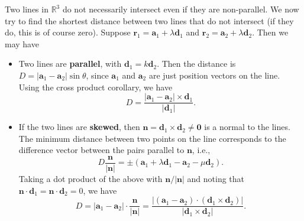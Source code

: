 \documentclass[letter-paper]{tufte-book}
\newcommand{\ab}{\boldsymbol{a}}
\newcommand{\db}{\boldsymbol{d}}
\newcommand{\nb}{\boldsymbol{n}}
\newcommand\Def[1]{\textbf{#1}}
\begin{document}
Two lines in $\mathbb{R}^3$ do not necessarily intersect even if they are
non-parallel. We now try to find the shortest distance between two lines that do
not intersect (if they do, this is of course zero). Suppose
$\boldsymbol{r}_1=\ab_1+\lambda\db_1$ and $\boldsymbol{r}_2=\ab_2+\lambda\db_2$.
Then we may have
\begin{itemize}
	\item Two lines are \Def{parallel}, with $\db_1=k\db_2$. Then the
	distance is $D=|\ab_1-\ab_2|\sin\theta$, since $\ab_1$ and $\ab_2$ are just
	position vectors on the line. Using the cross product corollary, we have
	\begin{equation*}
		D=\frac{|\ab_1-\ab_2|\times\db_1}{|\db_1|}.
	\end{equation*}
	\item If the two lines are \Def{skewed}, then
	$\nb=\db_1\times\db_2\neq\boldsymbol{0}$ is a normal to the lines. The
	minimum distance between two points on the line corresponds to the
	difference vector between the pairs parallel to $\nb$, i.e.,
	\begin{equation*}
		D\frac{\nb}{|\nb|}=\pm(\ab_1+\lambda\db_1-\ab_2-\mu\db_2).
	\end{equation*}
	Taking a dot product of the above with $\nb/|\nb|$ and noting that
	$\nb\cdot\db_1=\nb\cdot\db_2=0$, we have
	\begin{equation*}
		D=|\ab_1-\ab_2|\cdot\frac{\nb}{|\nb|}=
		\frac{|(\ab_1-\ab_2)\cdot(\db_1\times\db_2)|}{|\db_1 \times \db_2|}.
	\end{equation*}
\end{itemize}
\end{document}
